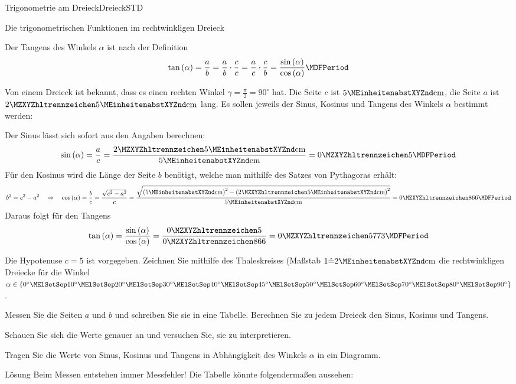 \begin{MXContent}{Trigonometrie am Dreieck}{Dreieck}{STD}
\begin{MXInfo}{Die trigonometrischen Funktionen im rechtwinkligen Dreieck}
\end{MXInfo}

Der Tangens des Winkels $\alpha$ ist nach der Definition \[\tan\left(\alpha\right)=\frac{a}{b}=\frac{a}{b}\cdot\frac{c}{c}=\frac{a}{c}\cdot\frac{c}{b}=\frac{\sin\left(\alpha\right)}{\cos\left(\alpha\right)} \MDFPeriod\]

\begin{MExample}
Von einem Dreieck ist bekannt, dass es einen rechten Winkel $\gamma=\frac{\pi}{2}=90^\circ$ hat. Die Seite $c$ ist $5\MEinheit{cm}$, die Seite $a$ ist $\MZahl{2}{5}\MEinheit{cm}$ lang. Es sollen jeweils der Sinus, Kosinus und Tangens des Winkels $\alpha$ bestimmt werden:

Der Sinus l\"asst sich sofort aus den Angaben berechnen:
\[\sin\left(\alpha\right)=\frac{a}{c}=\frac{\MZahl{2}{5}\MEinheit{cm}}{5\MEinheit{cm}}=\MZahl{0}{5} \MDFPeriod\]
F\"ur den Kosinus wird die L\"ange der Seite $b$ ben\"otigt, welche man mithilfe des Satzes von Pythagoras erh\"alt:
\[b^2=c^2-a^2\quad\Rightarrow\quad\cos\left(\alpha\right)=\frac{b}{c}=\frac{\sqrt{c^2-a^2}}{c}=\frac{\sqrt{\left(5\MEinheit{cm}\right)^2-\left(\MZahl{2}{5}\MEinheit{cm}\right)^2}}{5\MEinheit{cm}}=\MZahl{0}{866} \MDFPeriod\]
Daraus folgt f\"ur den Tangens
\[\tan\left(\alpha\right)=\frac{\sin\left(\alpha\right)}{\cos\left(\alpha\right)}=\frac{\MZahl{0}{5}}{\MZahl{0}{866}}=\MZahl{0}{5773} \MDFPeriod\]
\end{MExample}


\begin{MExercise}
Die Hypotenuse $c=5$ ist vorgegeben. Zeichnen Sie mithilfe des Thaleskreises (Ma\ss stab $ 1\hat{=}2\MEinheit{cm}$
die rechtwinkligen Dreiecke f\"ur die Winkel $\alpha\in\left\{0^\circ\MElSetSep 10^\circ\MElSetSep 20^\circ\MElSetSep 30^\circ\MElSetSep 40^\circ\MElSetSep 45^\circ\MElSetSep
50^\circ\MElSetSep 60^\circ\MElSetSep 70^\circ\MElSetSep 80^\circ\MElSetSep 90^\circ\right\}$.

Messen Sie die Seiten $a$ und $b$ und schreiben Sie sie in eine Tabelle. Berechnen Sie zu jedem Dreieck den Sinus, Kosinus und Tangens.

Schauen Sie sich die Werte genauer an und versuchen Sie, sie zu interpretieren.

Tragen Sie die Werte von Sinus, Kosinus und Tangens in Abh\"angigkeit des Winkels $\alpha$ in ein Diagramm.

\begin{MHint}{L\"osung}
Beim Messen entstehen immer Messfehler!
Die Tabelle k\"onnte folgenderma\ss en aussehen:


\end{MHint}
\end{MExercise}
\end{MXContent}
